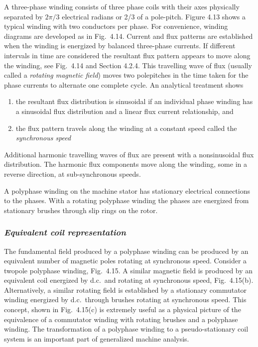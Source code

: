 \documentclass[a4paper,numbers=noenddot,12pt]{scrbook}
\begin{document}
A three-phase winding consists of three phase coils with their axes physically separated by $2\pi/3$ electrical radians or 2/3 of a pole-pitch. Figure 4.13 shows a typical winding with two conductors per phase. For convenience, winding diagrams are developed as in Fig.\ 4.14. Current and flux patterns are established when the winding is energized by balanced three-phase currents. If different intervals in time are considered the resultant flux pattern appears to move along the
winding, see Fig.\ 4.14 and Section 4.2.4. This travelling wave of flux (usually called a \textit{rotating magnetic field}) moves two pole­pitches in the time taken for the phase currents to alternate one complete cycle. An analytical treatment shows 
\begin{enumerate}
    \item the resultant flux distribution is sinusoidal if an individual phase winding has a sinusoidal flux distribution and a linear flux current relationship, and
    \item the flux pattern travels along the winding at a constant speed called the \textit{synchronous speed}
\end{enumerate}

Additional harmonic travelling waves of flux are present with a non­sinusoidal flux distribution. The harmonic flux components move along the winding, some in a reverse direction, at sub-synchronous speeds. 

A polyphase winding on the machine stator has stationary electrical connections to the phases. With a rotating polyphase winding the phases are energized from stationary brushes through slip rings on the rotor.

\subsubsection{\textit{Equivalent coil representation}}
The fundamental field produced by a polyphase winding can be produced by an equivalent number of magnetic poles rotating at synchronous speed. Consider a two­pole polyphase winding, Fig.\ 4.15. A similar magnetic field is produced by an equivalent coil energized by d.c.\ and rotating at synchronous speed, Fig.\ 4.15(b). Alternatively, a similar rotating field is established by a stationary commutator winding energized by
d.c.\ through brushes rotating at synchronous speed. This concept, shown in Fig.\ 4.15(c) is extremely useful as a physical picture of the equivalence of a commutator winding with rotating brushes and a polyphase winding. The transformation of a polyphase winding to a pseudo-stationary coil system is an important part of generalized machine analysis. 
\end{document}
